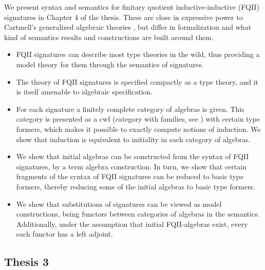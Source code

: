 \documentclass[12pt]{article}
\begin{document}
We present syntax and semantics for finitary quotient inductive-inductive (FQII)
signatures in Chapter 4 of the thesis. These are close in expressive power to
Cartmell's generalized algebraic theories \cite{gat}, but differ in
formalization and what kind of semantics results and constructions are built
around them.
\begin{itemize}
\item FQII signatures can describe most type theories in the wild, thus
      providing a model theory for them through the semantics of signatures.
\item The theory of FQII signatures is specified compactly as a type theory, and
      it is itself amenable to algebraic specification.
\item For each signature a finitely complete category of algebras is given. This
      category is presented as a cwf (category with families, see \cite{cwfs}) with
      certain type formers, which makes it possible to exactly compute notions of
      induction. We show that induction is equivalent to initiality in each category
      of algebras.
\item We show that initial algebras can be constructed from the syntax of FQII signatures,
      by a term algebra construction. In turn, we show that certain fragments of the syntax
      of FQII signatures can be reduced to basic type formers, thereby reducing some of
      the initial algebras to basic type formers.
\item We show that substitutions of signatures can be viewed as model constructions, being
      functors between categories of algebras in the semantics. Additionally, under the
      assumption that initial FQII-algebras exist, every such functor has a left adjoint.
\end{itemize}

\subsection*{Thesis 3}
\end{document}
